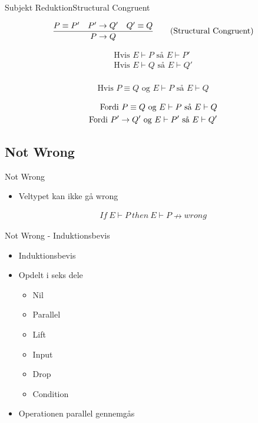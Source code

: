 \begin{frame}{Subjekt Reduktion}{Structural Congruent}

\begin{align*}
\frac{P \equiv P' \quad P' \rightarrow Q' \quad Q' \equiv Q}{P \rightarrow Q} \tag{Structural Congruent}
\end{align*}

\begin{align*}
\text{Hvis } E \vdash P \text{ så } E \vdash P'\\
\text{Hvis } E \vdash Q \text{ så } E \vdash Q'\\
\end{align*}

\begin{align*}
\tag{Lemma 2 Equivalent} \text{Hvis } P \equiv Q \text{ og } E \vdash P \text{ så } E \vdash Q
\end{align*}

\begin{align*}
\text{Fordi } P \equiv Q \text{ og } E \vdash P \text{ så } E \vdash Q\\
\text{Fordi } P' \rightarrow Q' \text{ og } E \vdash P' \text{ så } E \vdash Q'\\
\end{align*}
\end{frame}

\subsection{Not Wrong}

\begin{frame}{Not Wrong}

	\begin{itemize}
		\item Veltypet kan ikke gå wrong
	\end{itemize}

	\begin{align}
		If\ E \vdash P\ then\ E \vdash P \nrightarrow wrong \tag{Not Wrong}
	\end{align}

\end{frame}

\begin{frame}{Not Wrong - Induktionsbevis}

	\begin{itemize}
		\item Induktionsbevis
		\item Opdelt i seks dele
		\begin{itemize}
			\item Nil
			\item Parallel
			\item Lift
			\item Input
			\item Drop
			\item Condition
		\end{itemize}
		\item Operationen parallel gennemgås
	\end{itemize}

\end{frame}

